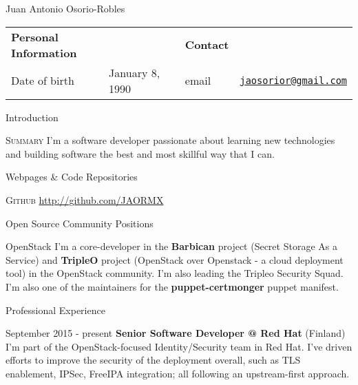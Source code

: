 \documentclass[english,10pt,letterpaper]{article}
\begin{document}
\centering
\begin{cv}{Juan Antonio Osorio-Robles}

	\begin{table}[h]
		\begin{tabular}{@{} l l p{0.5cm} l r}
			{\bf Personal Information}	&	&	&	{\bf Contact}	&\\
			Date of birth &	January 8, 1990	&	&
			email & \href{mailto:jaosorior@gmail.com}{\tt jaosorior@gmail.com}\\
		\end{tabular}
	\end{table}

	\begin{cvlist}{Introduction}
        \item[\textsc{Summary}]
            I'm a software developer passionate about learning new technologies
            and building software the best and most skillful way that I can.
	\end{cvlist}

	\begin{cvlist}{Webpages \& Code Repositories}
        \item [\textsc{Github}]
            \href{http://github.com/JAORMX}{http://github.com/JAORMX}
	\end{cvlist}

    \begin{cvlist}{Open Source Community Positions}
		\item [OpenStack]
            I'm a core-developer in the \textbf{Barbican} project (Secret
            Storage As a Service) and \textbf{TripleO} project (OpenStack
            over Openstack - a cloud deployment tool) in the OpenStack
            community. I'm also leading the Tripleo Security Squad. I'm also
            one of the maintainers for the \textbf{puppet-certmonger} puppet
            manifest.
	\end{cvlist}

	\begin{cvlist}{Professional Experience}
		\item [September 2015 - present]
            \textbf{Senior Software Developer @ Red Hat} (Finland)\\
            I'm part of the OpenStack-focused Identity/Security team in Red
            Hat. I've driven efforts to improve the security of the deployment
            overall, such as TLS enablement, IPSec, FreeIPA integration; all
            following an upstream-first approach.


\end{cvlist}
\end{cv}
\end{document}
